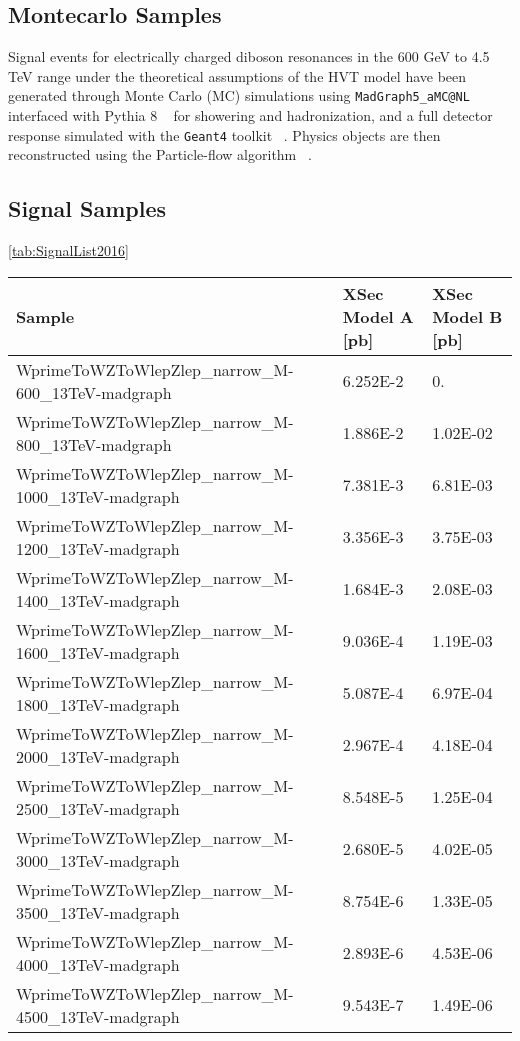 \subsection{Montecarlo Samples}

Signal events for electrically charged diboson resonances in the 600 GeV
to 4.5 TeV range under the theoretical assumptions of the HVT model
have been generated through Monte Carlo (MC) simulations
using \verb|MadGraph5_aMC@NL| ~\cite{madgraph} interfaced with Pythia 8
~\cite{pythia} for showering and hadronization, and a
full detector response simulated with the \verb|Geant4| toolkit ~\cite{geant4}.
Physics objects are then reconstructed using the
Particle-flow algorithm ~\cite{particleflow}.

\subsection {Signal Samples}

\ref{tab:SignalList2016}

\begin{sidewaystable}[htb]
\begin{center}
\caption{List of background samples for 2016}
\footnotesize
\begin{tabular}{|l|l|l|}
\hline
Sample & XSec Model A [pb] & XSec Model B [pb]\\ \hline
\hline
WprimeToWZToWlepZlep\_narrow\_M-600\_13TeV-madgraph  & 6.252E-2 & 0. \\
WprimeToWZToWlepZlep\_narrow\_M-800\_13TeV-madgraph  & 1.886E-2 & 1.02E-02\\
WprimeToWZToWlepZlep\_narrow\_M-1000\_13TeV-madgraph & 7.381E-3 & 6.81E-03\\
WprimeToWZToWlepZlep\_narrow\_M-1200\_13TeV-madgraph & 3.356E-3 & 3.75E-03\\
WprimeToWZToWlepZlep\_narrow\_M-1400\_13TeV-madgraph & 1.684E-3 & 2.08E-03\\
WprimeToWZToWlepZlep\_narrow\_M-1600\_13TeV-madgraph & 9.036E-4 & 1.19E-03\\
WprimeToWZToWlepZlep\_narrow\_M-1800\_13TeV-madgraph & 5.087E-4 & 6.97E-04\\
WprimeToWZToWlepZlep\_narrow\_M-2000\_13TeV-madgraph & 2.967E-4 & 4.18E-04\\
WprimeToWZToWlepZlep\_narrow\_M-2500\_13TeV-madgraph & 8.548E-5 & 1.25E-04\\
WprimeToWZToWlepZlep\_narrow\_M-3000\_13TeV-madgraph & 2.680E-5 & 4.02E-05\\
WprimeToWZToWlepZlep\_narrow\_M-3500\_13TeV-madgraph & 8.754E-6 & 1.33E-05\\
WprimeToWZToWlepZlep\_narrow\_M-4000\_13TeV-madgraph & 2.893E-6 & 4.53E-06\\
WprimeToWZToWlepZlep\_narrow\_M-4500\_13TeV-madgraph & 9.543E-7 & 1.49E-06\\
\hline
\end{tabular}
\label{tab:SignalList2016}
\end{center}
\end{sidewaystable}



